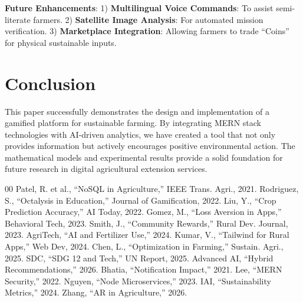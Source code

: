 \documentclass[journal]{IEEEtran}
\begin{document}
\textbf{Future Enhancements}:
1) \textbf{Multilingual Voice Commands}: To assist semi-literate farmers.
2) \textbf{Satellite Image Analysis}: For automated mission verification.
3) \textbf{Marketplace Integration}: Allowing farmers to trade ``Coins'' for physical sustainable inputs.

\section{Conclusion}
This paper successfully demonstrates the design and implementation of a gamified platform for sustainable farming. By integrating MERN stack technologies with AI-driven analytics, we have created a tool that not only provides information but actively encourages positive environmental action. The mathematical models and experimental results provide a solid foundation for future research in digital agricultural extension services.

\begin{thebibliography}{00}
 Patel, R. et al., ``NoSQL in Agriculture,'' IEEE Trans. Agri., 2021.
 Rodriguez, S., ``Octalysis in Education,'' Journal of Gamification, 2022.
 Liu, Y., ``Crop Prediction Accuracy,'' AI Today, 2022.
 Gomez, M., ``Loss Aversion in Apps,'' Behavioral Tech, 2023.
 Smith, J., ``Community Rewards,'' Rural Dev. Journal, 2023.
 AgriTech, ``AI and Fertilizer Use,'' 2024.
 Kumar, V., ``Tailwind for Rural Apps,'' Web Dev, 2024.
 Chen, L., ``Optimization in Farming,'' Sustain. Agri., 2025.
 SDC, ``SDG 12 and Tech,'' UN Report, 2025.
 Advanced AI, ``Hybrid Recommendations,'' 2026.
 Bhatia, ``Notification Impact,'' 2021.
 Lee, ``MERN Security,'' 2022.
 Nguyen, ``Node Microservices,'' 2023.
 IAI, ``Sustainability Metrics,'' 2024.
 Zhang, ``AR in Agriculture,'' 2026.
\end{thebibliography}
\end{document}
